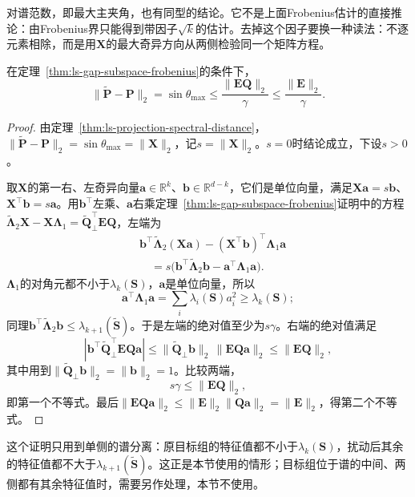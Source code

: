 对谱范数，即最大主夹角，也有同型的结论。它不是上面Frobenius估计的直接推论：由Frobenius界只能得到带因子$\sqrt k$的估计。去掉这个因子要换一种读法：不逐元素相除，而是用$\bm X$的最大奇异方向从两侧检验同一个矩阵方程。
\begin{theorem}
\label{thm:ls-davis-kahan}
在定理~\ref{thm:ls-gap-subspace-frobenius}的条件下，
\begin{equation}
 \lVert\widetilde{\bm P}-\bm P\rVert_2=\sin\theta_{\max}
 \leq\frac{\lVert\bm E\bm Q\rVert_2}{\gamma}\leq\frac{\lVert\bm E\rVert_2}{\gamma}.
 \label{eq:matrix-analysis-eigenvector-gap-bound}
\end{equation}
\end{theorem}
\begin{proof}
由定理~\ref{thm:ls-projection-spectral-distance}，$\lVert\widetilde{\bm P}-\bm P\rVert_2=\sin\theta_{\max}=\lVert\bm X\rVert_2$，记$s=\lVert\bm X\rVert_2$。$s=0$时结论成立，下设$s>0$。

取$\bm X$的第一右、左奇异向量$\bm a\in\mathbb R^k$、$\bm b\in\mathbb R^{d-k}$，它们是单位向量，满足$\bm X\bm a=s\bm b$、$\bm X^\top\bm b=s\bm a$。用$\bm b^\top$左乘、$\bm a$右乘定理~\ref{thm:ls-gap-subspace-frobenius}证明中的方程$\widetilde{\bm\Lambda}_2\bm X-\bm X\bm\Lambda_1=\widetilde{\bm Q}_\perp^\top\bm E\bm Q$，左端为
\[
 \begin{aligned}
 &\bm b^\top\widetilde{\bm\Lambda}_2(\bm X\bm a)-(\bm X^\top\bm b)^\top\bm\Lambda_1\bm a\\
 &\quad=s\bigl(\bm b^\top\widetilde{\bm\Lambda}_2\bm b-\bm a^\top\bm\Lambda_1\bm a\bigr).
 \end{aligned}
\]
$\bm\Lambda_1$的对角元都不小于$\lambda_k(\bm S)$，$\bm a$是单位向量，所以
\[
 \bm a^\top\bm\Lambda_1\bm a=\sum_i\lambda_i(\bm S)a_i^2\geq\lambda_k(\bm S);
\]
同理$\bm b^\top\widetilde{\bm\Lambda}_2\bm b\leq\lambda_{k+1}(\widetilde{\bm S})$。于是左端的绝对值至少为$s\gamma$。右端的绝对值满足
\[
 |\bm b^\top\widetilde{\bm Q}_\perp^\top\bm E\bm Q\bm a|
 \leq\lVert\widetilde{\bm Q}_\perp\bm b\rVert_2\,\lVert\bm E\bm Q\bm a\rVert_2
 \leq\lVert\bm E\bm Q\rVert_2 ,
\]
其中用到$\lVert\widetilde{\bm Q}_\perp\bm b\rVert_2=\lVert\bm b\rVert_2=1$。比较两端，
\[
 s\gamma\leq\lVert\bm E\bm Q\rVert_2 ,
\]
即第一个不等式。最后$\lVert\bm E\bm Q\bm a\rVert_2\leq\lVert\bm E\rVert_2\lVert\bm Q\bm a\rVert_2=\lVert\bm E\rVert_2$，得第二个不等式。
\end{proof}
这个证明只用到单侧的谱分离：原目标组的特征值都不小于$\lambda_k(\bm S)$，扰动后其余的特征值都不大于$\lambda_{k+1}(\widetilde{\bm S})$。这正是本节使用的情形；目标组位于谱的中间、两侧都有其余特征值时，需要另作处理，本节不使用。


